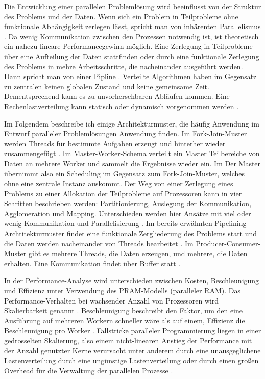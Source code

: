 \documentclass[a4paper,12pt,twoside]{article}
\begin{document}
Die Entwicklung einer parallelen Problemlösung wird beeinflusst von der Struktur des Problems und der Daten. Wenn sich ein Problem in Teilprobleme ohne funktionale Abhängigkeit zerlegen lässt, spricht man von inhärenten Parallelismus {\autocite[S. 321f]{Bengel2008}}. Da wenig Kommunikation zwischen den Prozessen notwendig ist, ist theoretisch ein nahezu lineare Performancegewinn möglich. Eine Zerlegung in Teilprobleme über eine Aufteilung der Daten stattfinden oder durch eine funktionale Zerlegung des Problems in mehre Arbeitsschritte, die nacheinander ausgeführt werden. Dann spricht man von einer Pipline {\autocite[S. 324]{Bengel2008}}. Verteilte Algorithmen haben im Gegensatz zu zentralen keinen globalen Zustand und keine gemeinsame Zeit. Dementsprechend kann es zu unvorhersehbaren Abläufen kommen. Eine Rechenlastverteilung kann statisch oder dynamisch vorgenommen werden {\autocite{Bengel2008}}.

Im Folgendem beschreibe ich einige Architekturmuster, die häufig Anwendung im Entwurf paralleler Problemlösungen Anwendung finden. Im Fork-Join-Muster werden Threads für bestimmte Aufgaben erzeugt und hinterher wieder zusammengefügt {\autocite[S. 109]{Rauber2013}}. Im Master-Worker-Schema verteilt ein Master Teilbereiche von Daten an mehrere Worker und sammelt die Ergebnisse wieder ein. Im Der Master übernimmt also ein Scheduling im Gegensatz zum Fork-Join-Muster, welches ohne eine zentrale Instanz auskommt. Der Weg von einer Zerlegung eines Problems zu einer Allokation der Teilprobleme auf Prozessoren kann in vier Schritten beschrieben werden: Partitionierung, Auslegung der Kommunikation, Agglomeration und Mapping. Unterschieden werden hier Ansätze mit viel oder wenig Kommunikation und Parallelisierung {\autocite[S. 326f]{Bengel2008}}. Im bereits erwähnten Pipelining-Archtitekturmuster findet eine funktionale Zergliederung des Problems statt und die Daten werden nacheinander von Threads bearbeitet {\autocite[S. 111]{Rauber2013}}. Im Producer-Consumer-Muster gibt es mehrere Threads, die Daten erzeugen, und mehrere, die Daten erhalten. Eine Kommunikation findet über Buffer statt  {\autocite[S. 112]{Rauber2013}}.

In der Performance-Analyse wird unterschieden zwischen Kosten, Beschleunigung und Effizienz unter Verwendung des PRAM-Modells (paralleler RAM). Das Performance-Verhalten bei wachsender Anzahl von Prozessoren wird Skalierbarkeit genannt {\cite{Rauber2013}}. Beschleunigung beschreibt den Faktor, um den eine Ausführung auf mehreren Workern schneller wäre als auf einem, Effizienz die Beschleunigung pro Worker {\autocite[S. 56]{McCool2012}}. Fallstricke paralleler Programmierung liegen in einer gedrosselten Skalierung, also einem nicht-linearen Anstieg der Performance mit der Anzahl genutzter Kerne verursacht unter anderem durch eine unausgeglichene Lastenverteilung durch eine ungünstige Lastenverteilung oder durch einen großen Overhead für die Verwaltung der parallelen Prozesse {\autocite[S. 74]{McCool2012}}.
\end{document}
